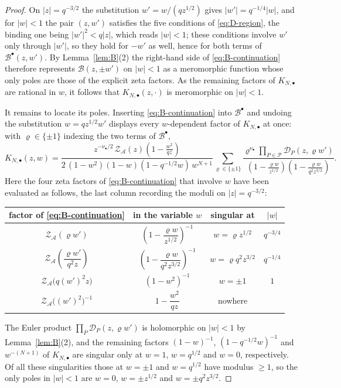 \documentclass[10pt,a4paper]{amsart}
\newcommand{\A}{\mathcal{A}}
\begin{document}
\begin{proof}
On $|z|=q^{-3/2}$ the substitution $w'=w/(qz^{1/2})$ gives
$|w'|=q^{-1/4}|w|$, and for $|w|<1$ the pair $(z,w')$ satisfies the five
conditions of \eqref{eq:D-region}, the binding one being $|w'|^2<q|z|$,
which reads $|w|<1$; these conditions involve $w'$ only through $|w'|$, so
they hold for $-w'$ as well, hence for both terms of
$\mathcal B^{\bullet}(z,w')$. By Lemma~\ref{lem:B}(2) the right-hand side of
\eqref{eq:B-continuation} therefore represents $\mathcal B(z,\pm w')$ on
$|w|<1$ as a meromorphic function whose only poles are those of the explicit
zeta factors. As the remaining factors of $K_{N,\bullet}$ are rational in
$w$, it follows that $K_{N,\bullet}(z,\cdot)$ is meromorphic on $|w|<1$.

It remains to locate its poles. Inserting \eqref{eq:B-continuation} into
$\mathcal B^{\bullet}$ and undoing the substitution $w=qz^{1/2}w'$ displays
every $w$-dependent factor of $K_{N,\bullet}$ at once: with
$\varrho\in\{\pm1\}$ indexing the two terms of $\mathcal B^{\bullet}$,
$$
K_{N,\bullet}(z,w)
=
\frac{z^{-\nu_\bullet/2}\,\mathcal Z_{\A}(z)
\left(1-\frac{w^2}{qz}\right)}
{2\,(1-w^2)(1-w)(1-q^{-1/2}w)\,w^{N+1}}
\sum_{\varrho\in\{\pm1\}}
\frac{\varrho^{\nu_\bullet}
\prod_{P\in\mathcal P}\mathcal D_P(z,\varrho w')}
{\left(1-\frac{\varrho w}{z^{1/2}}\right)
\left(1-\frac{\varrho w}{q^2z^{3/2}}\right)}.
$$
Here the four zeta factors of \eqref{eq:B-continuation} that involve $w$
have been evaluated as follows, the last column recording the moduli on
$|z|=q^{-3/2}$:
\begin{center}
\renewcommand{\arraystretch}{1.4}
\begin{tabular}{c c c c}
factor of \eqref{eq:B-continuation} & in the variable $w$ & singular at &
$|w|$\\
\hline
$\mathcal Z_{\A}(\varrho w')$
& $\left(1-\dfrac{\varrho w}{z^{1/2}}\right)^{-1}$
& $w=\varrho z^{1/2}$
& $q^{-3/4}$\\

$\mathcal Z_{\A}\!\left(\dfrac{\varrho w'}{q^2z}\right)$
& $\left(1-\dfrac{\varrho w}{q^2z^{3/2}}\right)^{-1}$
& $w=\varrho q^2z^{3/2}$
& $q^{-1/4}$\\

$\mathcal Z_{\A}\bigl(q(w')^2z\bigr)$
& $\left(1-w^2\right)^{-1}$
& $w=\pm1$
& $1$\\

$\mathcal Z_{\A}\bigl((w')^2\bigr)^{-1}$
& $1-\dfrac{w^2}{qz}$
& nowhere
& \\
\end{tabular}
\end{center}
The Euler product $\prod_P\mathcal D_P(z,\varrho w')$ is holomorphic on
$|w|<1$ by Lemma~\ref{lem:B}(2), and the remaining factors $(1-w)^{-1}$,
$(1-q^{-1/2}w)^{-1}$ and $w^{-(N+1)}$ of $K_{N,\bullet}$ are singular only
at $w=1$, $w=q^{1/2}$ and $w=0$, respectively. Of all these singularities
those at $w=\pm1$ and $w=q^{1/2}$ have modulus $\ge1$, so the only poles in
$|w|<1$ are $w=0$, $w=\pm z^{1/2}$ and $w=\pm q^{2}z^{3/2}$.
\end{proof}
\end{document}
